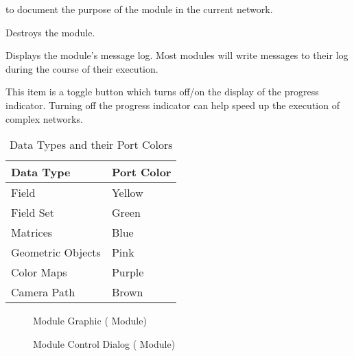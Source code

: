 \begin{description}
\begin{description}
    to document the purpose of the module in the current network.
  \item[\menuitem{Destroy}] Destroys the module.
  \item[\menuitem{Show Log}] Displays the module's message log.  Most modules will
    write messages to their log during the course of their execution.
  \item[\menuitem{Show Status}] This item is a toggle button which turns off/on the
    display of the progress indicator.  Turning off the progress indicator
    can help speed up the execution of complex networks.
  \end{description}
\end{description}

\begin{table}[htbp]
  \begin{center}
    \begin{tabular}{|l|l|}
      \hline
      \textbf{Data Type} & \textbf{Port Color} \\
      \hline
      Field & Yellow \\
      Field Set & Green \\
      Matrices & Blue \\
      Geometric Objects & Pink \\
      Color Maps & Purple \\
      Camera Path & Brown \\
      \hline
    \end{tabular}
    \caption{Data Types and their Port Colors}
    \label{tab:portcolors}
  \end{center}
\end{table}


\begin{figure}[htb]
  \begin{makeimage}
  \end{makeimage}
  \modgraphic
  \caption{\label{fig:modgraphic} Module Graphic ( Module)}
\end{figure}

\begin{figure}[htb]
  \begin{makeimage}
  \end{makeimage}
  \moddialog
  \caption{\label{fig:moddialog} Module Control Dialog ( Module)}
\end{figure}

